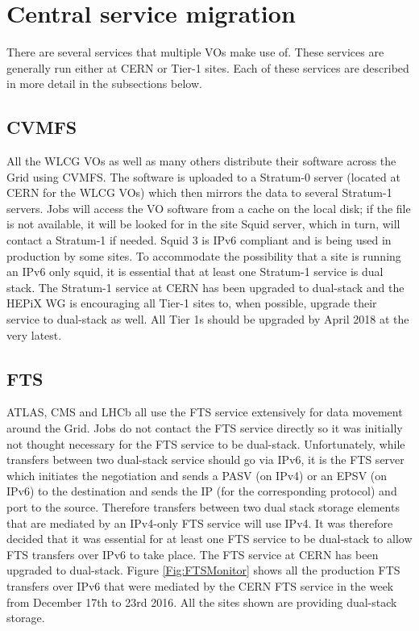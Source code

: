 \documentclass[a4paper]{jpconf}
\begin{document}
\section{Central service migration}
There are several services that multiple VOs make use of.  These services are generally run either at CERN or Tier-1 sites.   Each of these services are described in more detail in the subsections below.
\subsection{CVMFS}
All the WLCG VOs as well as many others distribute their software
across the Grid using CVMFS\cite{Stratum1}. The software is uploaded to a Stratum-0
server (located at CERN for the WLCG VOs) which then mirrors the data
to several Stratum-1 servers.  Jobs will access the VO
software from a cache on the local disk; if the file is not available,
it will be looked for in the site Squid server, which in turn, will
contact a Stratum-1 if needed. Squid 3 is IPv6 compliant and is
being used in production by some sites.  To accommodate the possibility that a site is running an IPv6 only squid, it is essential that at least one Stratum-1 service is dual stack.  The Stratum-1 service at CERN has been upgraded to dual-stack and the HEPiX WG is encouraging all Tier-1 sites to, when possible, upgrade their service to dual-stack as well. All Tier 1s should be upgraded by April 2018 at the very latest.

\subsection{FTS}
ATLAS, CMS and LHCb all use the FTS service extensively for data
movement around the Grid. Jobs do not contact the FTS service directly
so it was initially not thought necessary for the FTS service to be dual-stack.  Unfortunately, while transfers between 
two dual-stack service should go via IPv6, it is the FTS
server which initiates the negotiation and sends a PASV (on IPv4) or
an EPSV (on IPv6) to the destination and sends the IP (for the
corresponding protocol) and port to the source.  Therefore transfers between two dual stack storage elements that are mediated by an IPv4-only FTS service will use IPv4.  It was therefore decided that it was essential for at least one FTS service to be dual-stack to allow FTS transfers over IPv6 to take place.  The FTS service at CERN has been upgraded to dual-stack. Figure \ref{Fig:FTSMonitor} shows all the production FTS transfers over IPv6 that were mediated by the CERN FTS service in the week from December 17th to 23rd 2016.  All the sites shown are providing dual-stack storage.
\end{document}
